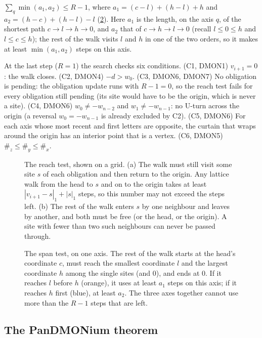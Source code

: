 \documentclass[11pt]{article}
\theoremstyle{plain}
\theoremstyle{definition}
\theoremstyle{remark}
\newcommand{\dmon}[1]{\textup{DMON#1}}
\begin{document}
\begin{description}[leftmargin=1.2em,font=\normalfont\bfseries]
$\sum_q\min(a_1,a_2)\le R-1$, where $a_1=(c-l)+(h-l)+h$ and $a_2=(h-c)+(h-l)-l$ (\cref{fig:span}). Here
$a_1$ is the length, on the axis $q$, of the shortest path $c\to l\to h\to0$, and $a_2$ that of
$c\to h\to l\to0$ (recall $l\le0\le h$ and $l\le c\le h$); the rest of the walk visits $l$ and $h$ in one of
the two orders, so it makes at least $\min(a_1,a_2)$ steps on this axis.
\item[Closing.] At the last step ($R=1$) the search checks six conditions.
(C1, \dmon1) $v_{i+1}=0$: the walk closes.
(C2, \dmon4) $-d>w_0$.
(C3, \dmon6, \dmon7) No obligation is pending: the obligation update runs with $R-1=0$, so the reach
test fails for every obligation still pending (its site would have to be the origin, which is never a
site).
(C4, \dmon6) $w_0\ne-w_{n-2}$ and $w_1\ne-w_{n-1}$: no U-turn across the origin (a reversal
$w_0=-w_{n-1}$ is already excluded by C2).
(C5, \dmon6) For each axis whose most recent and first letters are opposite, the curtain that wraps
around the origin has an interior point that is a vertex.
(C6, \dmon5) $\#_z\le\#_y\le\#_x$.
\end{description}

\begin{figure}[t]
\centering
\FigReach
\caption{The reach test, shown on a grid. (a) The walk must still visit some site $s$ of each
obligation and then return to the origin. Any lattice walk from the head to $s$ and on to the origin
takes at least $|v_{i+1}-s|_1+|s|_1$ steps, so this number may not exceed the steps left. (b) The rest
of the walk enters $s$ by one neighbour and leaves by another, and both must be free (or the head, or
the origin). A site with fewer than two such neighbours can never be passed through.}
\label{fig:reach}
\end{figure}

\begin{figure}[t]
\centering
\FigSpan
\caption{The span test, on one axis. The rest of the walk starts at the head's coordinate $c$, must
reach the smallest coordinate $l$ and the largest coordinate $h$ among the single sites (and $0$), and
ends at $0$. If it reaches $l$ before $h$ (orange), it uses at least $a_1$ steps on this axis; if it
reaches $h$ first (blue), at least $a_2$. The three axes together cannot use more than the $R-1$ steps
that are left.}
\label{fig:span}
\end{figure}

\subsection{The PanDMONium theorem}
\end{document}

